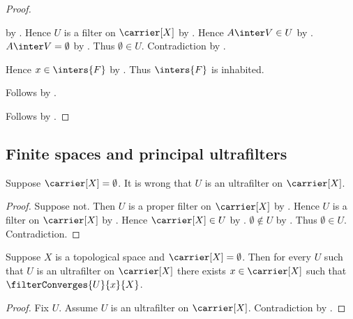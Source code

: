 \begin{proof}
\begin{subproof}
\begin{subproof}
\begin{subproof}
                    by .
                Hence $U$ is a filter on $\carrier[X]$
                    by .
                Hence $A\inter V\in U$
                    by .
                $A\inter V=\emptyset$
                    by .
                Thus $\emptyset\in U$.
                Contradiction by .
            \end{subproof}
            Hence $x\in\inters{F}$ by .
            Thus $\inters{F}$ is inhabited.
        \end{subproof}
        Follows by
            .
    \end{subproof}
    Follows by \auto.
\end{proof}

\subsection{Finite spaces and principal ultrafilters}

\begin{proposition}\label{empty_space_has_no_ultrafilter}
    Suppose $\carrier[X]=\emptyset$.
    It is wrong that $U$ is an ultrafilter on $\carrier[X]$.
\end{proposition}
\begin{proof}
    Suppose not.
    Then $U$ is a proper filter on $\carrier[X]$
        by .
    Hence $U$ is a filter on $\carrier[X]$
        by .
    Hence $\carrier[X]\in U$ by .
    $\emptyset\notin U$ by .
    Thus $\emptyset\in U$.
    Contradiction.
\end{proof}

\begin{corollary}\label{empty_space_satisfies_ultrafilter_compactness}
    Suppose $X$ is a topological space and $\carrier[X]=\emptyset$.
    Then for every $U$ such that
        $U$ is an ultrafilter on $\carrier[X]$ there exists
        $x\in\carrier[X]$ such that $\filterConverges{U}{x}{X}$.
\end{corollary}
\begin{proof}
    Fix $U$.
    Assume $U$ is an ultrafilter on $\carrier[X]$.
    Contradiction by .
\end{proof}


